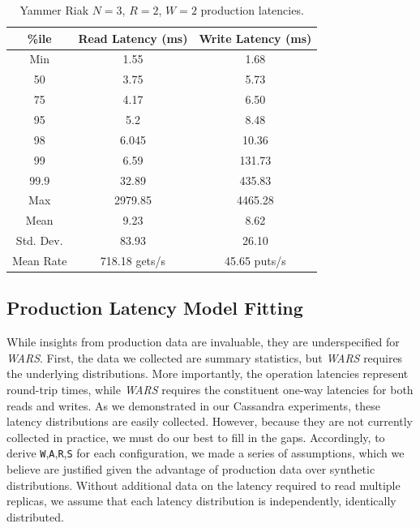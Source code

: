 \documentclass{vldb}
\begin{document}
\begin{table}
\centering
\begin{tabular}{|c|c|c|}
\hline
\%ile & Read Latency (ms) & Write Latency (ms)\\
\hline
Min & 1.55 & 1.68\\
50 & 3.75 & 5.73 \\
75 & 4.17 & 6.50\\
95 & 5.2 & 8.48\\
98 & 6.045 & 10.36 \\
99 & 6.59 & 131.73\\
99.9 & 32.89 & 435.83\\
Max & 2979.85 &  4465.28 \\
\hline
Mean & 9.23 & 8.62 \\
Std. Dev. & 83.93 & 26.10\\
\hline
Mean Rate & 718.18 gets/s & 45.65 puts/s\\
\hline
\end{tabular}
\vspace{-6pt}
\caption{Yammer Riak $N$$=$$3$, $R$$=$$2$, $W$$=$$2$ production latencies.}
\vspace{-12pt}
\label{table:yammer}
\end{table}

\subsection{Production Latency Model Fitting}

While insights from production data are invaluable, they are
underspecified for \textit{WARS}.  First, the data we collected are
summary statistics, but \textit{WARS} requires the underlying
distributions.  More importantly, the operation latencies represent
round-trip times, while \textit{WARS} requires the constituent one-way
latencies for both reads and writes.  As we demonstrated in our
Cassandra experiments, these latency distributions are easily
collected.  However, because they are not currently collected in
practice, we must do our best to fill in the gaps. Accordingly, to
derive \texttt{W},\texttt{A},\texttt{R},\texttt{S} for each
configuration, we made a series of assumptions, which we believe are
justified given the advantage of production data over synthetic
distributions.  Without additional data on the latency required to
read multiple replicas, we assume that each latency distribution is
independently, identically distributed.
\end{document}
